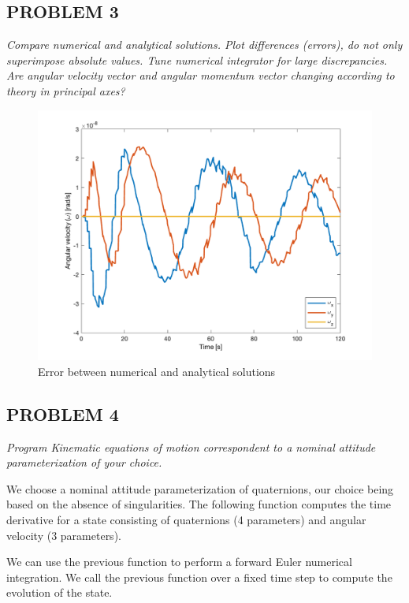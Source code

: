 \subsection{PROBLEM 3}
\textit{Compare numerical and analytical solutions. Plot differences (errors), do not only superimpose absolute values. Tune numerical integrator for large discrepancies. Are angular velocity vector and angular momentum vector changing according to theory in principal axes?}

\begin{figure}[H]
\centering
\includegraphics[scale=0.6]{Images/ps3_problem3.png}
\caption{Error between numerical and analytical solutions}
\label{fig:ps3_problem3}
\end{figure}


\subsection{PROBLEM 4}
\textit{Program Kinematic equations of motion correspondent to a nominal attitude parameterization of your choice.}

We choose a nominal attitude parameterization of quaternions, our choice being based on the absence of singularities. The following function computes the time derivative for a state consisting of quaternions (4 parameters) and angular velocity (3 parameters).



We can use the previous function to perform a forward Euler numerical integration. We call the previous function over a fixed time step to compute the evolution of the state.

